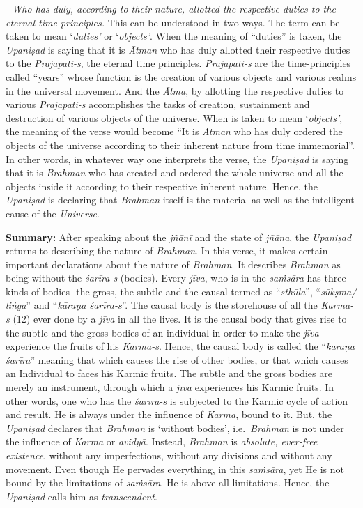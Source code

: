 - \emph{Who has duly, according to their nature, allotted the respective duties to the eternal time principles.} This can be understood in two ways. The term  can be taken to mean `\emph{duties'} or `\emph{objects'}. When the meaning of ``duties'' is taken, the \emph{Upaniṣad} is saying that it is \emph{Ātman} who has duly allotted their respective duties to the \emph{Prajāpati-s}, the eternal time principles. \emph{Prajāpati-s} are the time-principles called ``years'' whose function is the creation of various objects and various realms in the universal movement. And the \emph{Ātma}, by allotting the respective duties to various \emph{Prajāpati-s} accomplishes the tasks of creation, sustainment and destruction of various objects of the universe. When  is taken to mean `\emph{objects'}, the meaning of the verse would become ``It is \emph{Ātman} who has duly ordered the objects of the universe according to their inherent nature from time immemorial''. In other words, in whatever way one interprets the verse, the \emph{Upaniṣad} is saying that it is \emph{Brahman} who has created and ordered the whole universe and all the objects inside it according to their respective inherent nature. Hence, the \emph{Upaniṣad} is declaring that \emph{Brahman} itself is the material as well as the intelligent cause of the \emph{Universe}.

\textbf{Summary:} After speaking about the \emph{jñānī} and the state of \emph{jñāna}, the \emph{Upaniṣad} returns to describing the nature of \emph{Brahman}. In this verse, it makes certain important declarations about the nature of \emph{Brahman}. It describes \emph{Brahman} as being without the \emph{śarīra-s} (bodies). Every \emph{jīva}, who is in the \emph{saṁsāra} has three kinds of bodies- the gross, the subtle and the causal termed as ``\emph{sthūla}'', ``\emph{sūkṣma/ liṅga}'' and ``\emph{kāraṇa śarīra-s}''. The causal body is the storehouse of all the \emph{Karma-s} (12) ever done by a \emph{jīva} in all the lives. It is the causal body that gives rise to the subtle and the gross bodies of an individual in order to make the \emph{jīva} experience the fruits of his \emph{Karma-s}. Hence, the causal body is called the ``\emph{kāraṇa śarīra}'' meaning that which causes the rise of other bodies, or that which causes an Individual to faces his Karmic fruits. The subtle and the gross bodies are merely an instrument, through which a \emph{jīva} experiences his Karmic fruits. In other words, one who has the \emph{śarīra-s} is subjected to the Karmic cycle of action and result. He is always under the influence of \emph{Karma}, bound to it. But, the \emph{Upaniṣad} declares that \emph{Brahman} is `without bodies', i.e.\ \emph{Brahman} is not under the influence of \emph{Karma} or \emph{avidyā}. Instead, \emph{Brahman} is \emph{absolute, ever-free existence}, without any imperfections, without any divisions and without any movement. Even though He pervades everything, in this \emph{saṁsāra}, yet He is not bound by the limitations of \emph{saṁsāra}. He is above all limitations. Hence, the \emph{Upaniṣad} calls him as \emph{transcendent}.

